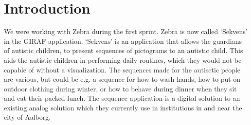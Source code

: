 \section{Introduction}
We were working with Zebra during the first sprint. Zebra is now called `Sekvens' in the GIRAF application. `Sekvens' is an application that allows the guardians of autistic children, to present sequences of pictograms to an autistic child. This aids the autistic children in performing daily routines, which they would not be capable of without a visualization. The sequences made for the autisctic people are various, but could be e.g. a sequence for how to wash hands, how to put on outdoor clothing during winter, or how to behave during dinner when they sit and eat their packed lunch. The sequence application is a digital solution to an existing analog solution which they currently use in institutions in and near the city of Aalborg.

